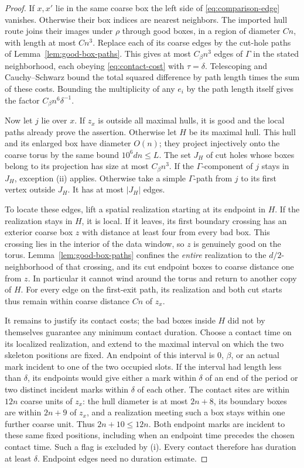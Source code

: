 \begin{proof}
If $x,x'$ lie in the same coarse box the left side of
\eqref{eq:comparison-edge} vanishes.  Otherwise their box indices
are nearest neighbors.  The imported hull route joins their images
under $\rho$ through good boxes, in a region of diameter $Cn$,
with length at most $Cn^3$.  Replace each of its coarse edges by
the cut-hole paths of Lemma~\ref{lem:good-box-paths}.  This gives
at most $C_\beta n^3$ edges of $\Gamma$ in the stated neighborhood,
each obeying \eqref{eq:contact-cost} with $\tau=\delta$.
Telescoping and Cauchy--Schwarz bound the total squared difference
by path length times the sum of these costs.  Bounding the
multiplicity of any $e_i$ by the path length itself gives the
factor $C_\beta n^6\delta^{-1}$.

Now let $j$ lie over $x$.  If $z_x$ is outside all maximal hulls,
it is good and the local paths already prove the assertion.
Otherwise let $H$ be its maximal hull.  This hull and its enlarged
box have diameter $O(n)$; they project injectively onto the coarse
torus by the same bound $10^6dn\le L$.  The set $J_H$ of cut holes whose
boxes belong to its projection has size at most $C_\beta n^3$.
If the $\Gamma$-component of $j$ stays in $J_H$, exception (ii)
applies.  Otherwise take a simple $\Gamma$-path from $j$ to its
first vertex outside $J_H$.  It has at most $|J_H|$ edges.

To locate these edges, lift a spatial
realization starting at its endpoint in $H$.  If the realization
stays in $H$, it is local.  If it leaves, its first boundary crossing
has an exterior coarse box $z$ with distance at least four from
every bad box.  This crossing lies in the interior of the data
window, so $z$ is genuinely good on the torus.
Lemma~\ref{lem:good-box-paths} confines the \emph{entire}
realization to the $d/2$-neighborhood of that crossing, and its
cut endpoint boxes to coarse distance one from $z$.  In particular
it cannot wind around the torus and return to another copy of $H$.
For every edge on the first-exit path, its realization and both cut
starts thus remain within coarse distance $Cn$ of $z_x$.

It remains to justify its contact costs; the bad boxes inside $H$
did not by themselves guarantee any minimum contact duration.
Choose a contact time on its localized realization, and extend to
the maximal interval on which the two skeleton positions are
fixed.  An endpoint of this interval is $0$, $\beta$, or an actual
mark incident to one of the two occupied slots.  If the interval
had length less than $\delta$, its endpoints would give either a
mark within $\delta$ of an end of the period or two distinct
incident marks within $\delta$ of each other.  The contact sites
are within $12n$ coarse units of $z_x$: the hull diameter is at most
$2n+8$, its boundary boxes are within $2n+9$ of $z_x$, and a
realization meeting such a box stays within one further coarse unit.
Thus $2n+10\le12n$.  Both endpoint marks are incident to these same
fixed positions, including when an endpoint time precedes the chosen
contact time.  Such a flag is
excluded by (i).  Every contact therefore has duration at least
$\delta$.  Endpoint edges need no duration estimate.


\end{proof}
